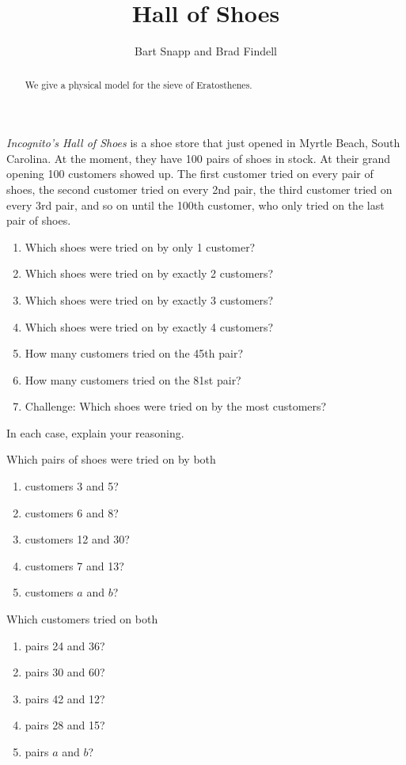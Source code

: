 \documentclass[nooutcomes]{ximera}
\title{Hall of Shoes}
\author{Bart Snapp and Brad Findell}
\begin{document}
\begin{abstract}
  We give a physical model for the sieve of Eratosthenes.
\end{abstract}
\maketitle

\label{A:Hall}
  
\begin{problem}  
\textit{Incognito's Hall of Shoes} is a shoe store that just
  opened in Myrtle Beach, South Carolina. At the moment, they have 100
  pairs of shoes in stock. At their grand opening 100 customers showed
  up. The first customer tried on every pair of shoes, the second
  customer tried on every 2nd pair, the third customer tried on every
  3rd pair, and so on until the 100th customer, who only tried on the
  last pair of shoes.
\begin{enumerate}
\item Which shoes were tried on by only 1 customer?
\item Which shoes were tried on by exactly 2 customers?
\item Which shoes were tried on by exactly 3 customers?
\item Which shoes were tried on by exactly 4 customers?
\item How many customers tried on the 45th pair?  
\item How many customers tried on the 81st pair?  
\item Challenge:  Which shoes were tried on by the most customers?  
\end{enumerate}
In each case, explain your reasoning.
\end{problem}

\begin{problem}
Which pairs of shoes were tried on by both 
\begin{enumerate}
\item customers 3 and 5?
\item customers 6 and 8?
\item customers 12 and 30?
\item customers 7 and 13?
\item customers $a$ and $b$?  
\end{enumerate}
\end{problem}

\begin{problem}
Which customers tried on both 
\begin{enumerate}
\item pairs 24 and 36?
\item pairs 30 and 60?
\item pairs 42 and 12?
\item pairs 28 and 15?
\item pairs $a$ and $b$?  
\end{enumerate}
\end{problem}
\end{document}
